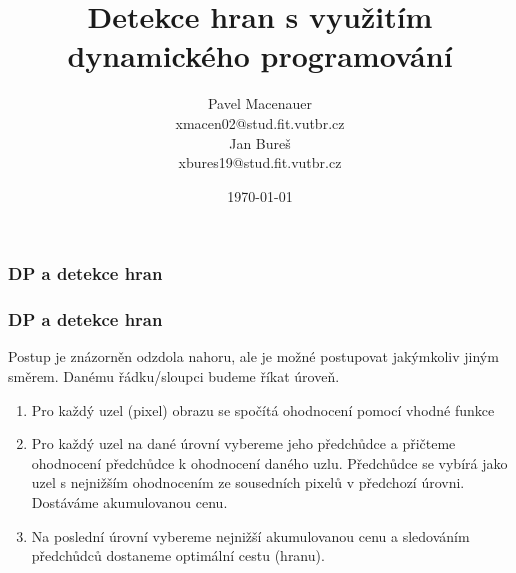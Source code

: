 \documentclass{beamer}
\title{\large{\textbf{Detekce hran s využitím dynamického programování}}}
\author{Pavel Macenauer \\ \tiny{xmacen02@stud.fit.vutbr.cz} \\ \normalsize{Jan Bureš} \\ \tiny{xbures19@stud.fit.vutbr.cz}}
\date{\tiny{\today}}
\institute[FIT VUTBR]
{
	\inst{}
	Fakulta Informačních Technologií \\
	Vysoké Učení Technické v Brně
}
\begin{document}
	\begin{frame}[t,plain]
	\titlepage

	\vspace{-7mm}
	\end{frame}


	\begin{frame}[t,fragile]
		\frametitle{DP a detekce hran}	
	\end{frame}
	

	\begin{frame}[t,fragile]
		\frametitle{DP a detekce hran}	
Postup je znázorněn odzdola nahoru, ale je možné postupovat jakýmkoliv jiným směrem. Danému řádku/sloupci budeme říkat úroveň.

		\begin{enumerate}
			\item Pro každý uzel (pixel) obrazu se spočítá ohodnocení pomocí vhodné funkce
			\item Pro každý uzel na dané úrovní vybereme jeho předchůdce a přičteme ohodnocení předchůdce k ohodnocení daného uzlu. Předchůdce se vybírá jako uzel s nejnižším ohodnocením ze sousedních pixelů v předchozí úrovni. Dostáváme akumulovanou cenu.
			\item Na poslední úrovní vybereme nejnižší akumulovanou cenu a sledováním předchůdců dostaneme optimální cestu (hranu).
		\end{enumerate}
	\end{frame}
	
	
	
\end{document}
